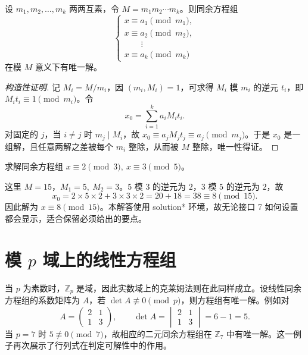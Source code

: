 	\begin{theorem}[中国剩余定理]
		设 $m_1,m_2,\dots,m_k$ 两两互素，令 $M=m_1m_2\cdots m_k$。则同余方程组
		\[
			\begin{cases}
				x\equiv a_1 \pmod{m_1},\\
				x\equiv a_2 \pmod{m_2},\\
				\qquad\vdots\\
				x\equiv a_k \pmod{m_k}
			\end{cases}
		\]
		在模 $M$ 意义下有唯一解。
	\end{theorem}
	\begin{proof}[构造性证明]
		记 $M_i=M/m_i$，因 $(m_i,M_i)=1$，可求得 $M_i$ 模 $m_i$ 的逆元 $t_i$，即 $M_it_i\equiv1\pmod{m_i}$。令
		\[
			x_0=\sum_{i=1}^{k} a_i M_i t_i.
		\]
		对固定的 $j$，当 $i\ne j$ 时 $m_j\mid M_i$，故 $x_0\equiv a_jM_jt_j\equiv a_j\pmod{m_j}$。于是 $x_0$ 是一组解，且任意两解之差被每个 $m_i$ 整除，从而被 $M$ 整除，唯一性得证。
	\end{proof}

	\begin{exercise}
		求解同余方程组 $x\equiv2\pmod 3,\ x\equiv3\pmod 5$。
	\end{exercise}
	\begin{solution*}
		这里 $M=15$，$M_1=5,\ M_2=3$。$5$ 模 $3$ 的逆元为 $2$，$3$ 模 $5$ 的逆元为 $2$，故
		\[
			x_0=2\times5\times2+3\times3\times2=20+18=38\equiv8\pmod{15}.
		\]
		因此解为 $x\equiv8\pmod{15}$。本解答使用 solution* 环境，故无论接口 7 如何设置都会显示，适合保留必须给出的要点。
	\end{solution*}

	\section{模 $p$ 域上的线性方程组}
	当 $p$ 为素数时，$\mathbb{Z}_p$ 是域，因此实数域上的克莱姆法则在此同样成立。设线性同余方程组的系数矩阵为 $A$，若 $\det A\not\equiv0\pmod p$，则方程组有唯一解。例如对
	\[
		A=\begin{pmatrix}2 & 1\\ 1 & 3\end{pmatrix},
		\qquad
		\det A=\begin{vmatrix}2 & 1\\ 1 & 3\end{vmatrix}=6-1=5.
		\]
	当 $p=7$ 时 $5\not\equiv0\pmod 7$，故相应的二元同余方程组在 $\mathbb{Z}_7$ 中有唯一解。这一例子再次展示了行列式在判定可解性中的作用。


	\printbibliography[title={\BibTitle}]
	\printindex

